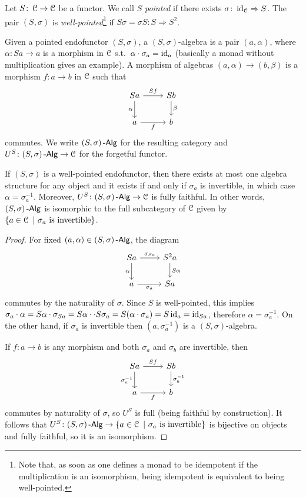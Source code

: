 \documentclass[a4paper,11pt,oneside,openany]{scrbook}
\begin{document}
\begin{defn}
	Let $S\colon\operatorname{\mathcal{C}}\to\operatorname{\mathcal{C}}$ be a functor. We call $S$ \emph{pointed} if there
    exists $\sigma\colon\operatorname{id}_{\operatorname{\mathcal{C}}}\Rightarrow S$. The pair $(S,\sigma)$ is
    \emph{well-pointed}\footnote{Note that, as soon as one defines a monad to be
    idempotent if the multiplication is an isomorphism, being idempotent is
    equivalent to being well-pointed.} if $S\sigma=\sigma S\colon S\Rightarrow
    S^2$.
\end{defn}
\begin{defn}
	Given a pointed endofunctor $(S,\sigma)$, a $(S,\sigma)$-algebra is a pair
    $(a,\alpha)$, where $\alpha\colon Sa\to a$ is a morphism in $\operatorname{\mathcal{C}}$ s.t.\
    $\alpha\cdot\sigma_a=\operatorname{id}_a$ (basically a monad without multiplication gives
    an example). A morphism of algebras $(a,\alpha)\to(b,\beta)$ is a morphism
    $f\colon a\to b$ in $\operatorname{\mathcal{C}}$ such that
	\[
		\begin{tikzcd}
			Sa\arrow["\alpha"']{d}\arrow["Sf"]{r}
			& Sb\arrow["\beta"]{d} \\
			a\arrow["f"']{r}
			& b
		\end{tikzcd}
	\]
	commutes. We write $(S,\sigma)\operatorname{-\mathsf{Alg}}$ for the resulting category and
    $U^S\colon(S,\sigma)\operatorname{-\mathsf{Alg}}\to\operatorname{\mathcal{C}}$ for the forgetful functor.
\end{defn}
\begin{lemma}
	If $(S,\sigma)$ is a well-pointed endofunctor, then there exists at most one
    algebra structure for any object and it exists if and only if $\sigma_a$ is
    invertible, in which case $\alpha=\sigma_a^{-1}$. Moreover,
    $U^S\colon(S,\sigma)\operatorname{-\mathsf{Alg}}\to\operatorname{\mathcal{C}}$ is fully faithful. In other words,
    $(S,\sigma)\operatorname{-\mathsf{Alg}}$ is isomorphic to the full subcategory of $\operatorname{\mathcal{C}}$ given by
    $\{a\in\operatorname{\mathcal{C}}\ |\ \sigma_a \ \text{is invertible} \}$.
\end{lemma}
\begin{proof}
	For fixed $(a,\alpha)\in(S,\sigma)\operatorname{-\mathsf{Alg}}$, the diagram
	\[
		\begin{tikzcd}
			Sa\arrow["\alpha"']{d}\arrow["\sigma_{Sa}"]{r}
			& S^2a\arrow["S\alpha"]{d} \\
			a\arrow["\sigma_a"']{r}
			& Sa
		\end{tikzcd}
	\]
	commutes by the naturality of $\sigma$. Since $S$ is well-pointed, this
    implies $\sigma_a\cdot\alpha=S\alpha\cdot\sigma_{Sa}=S\alpha\cdot
    \cdot S\sigma_a=S(\alpha\cdot\sigma_a)=S\operatorname{id}_a=\operatorname{id}_{Sa}$, therefore
    $\alpha=\sigma_a^{-1}$. On the other hand, if $\sigma_a$ is invertible then
    $(a,\sigma_a^{-1})$ is a $(S,\sigma)$-algebra.

	If $f\colon a\to b$ is any morphism and both $\sigma_a$ and $\sigma_b$ are
    invertible, then
	\[
		\begin{tikzcd}
			Sa\arrow["\sigma_a^{-1}"']{d}\arrow["Sf"]{r}
			& Sb\arrow["\sigma_b^{-1}"]{d} \\
			a\arrow["f"']{r}
			& b
		\end{tikzcd}
	\]
	commutes by naturality of $\sigma$, so $U^S$ is full (being faithful by
    construction). It follows that $U^S\colon(S,\sigma)\operatorname{-\mathsf{Alg}}\to\{a\in\operatorname{\mathcal{C}}\ |\
    \sigma_a \ \text{is invertible}\}$ is bijective on objects and fully
    faithful, so it is an isomorphism.
\end{proof}
\end{document}
